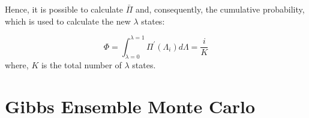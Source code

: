Hence, it is possible to calculate $\bar{\Pi} $ and, consequently, the cumulative probability, which is used to calculate the new $\lambda$ states:

\begin{equation}
\Phi = \int_{\lambda =0}^{\lambda =1} \Pi^{'}(\Lambda_{i}) d \Lambda = \dfrac{i}{K}
\label{eqn:cumfun}
\end{equation}
where, $K$ is the total number of $\lambda$ states.

\section{Gibbs Ensemble Monte Carlo}








